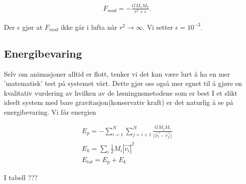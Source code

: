 \documentclass[11pt, twocolumn]{article}
\begin{document}
\begin{align}
F_{mod} = -\frac{GM_1M_2}{r^2 + \epsilon}.
\end{align}

Der $\epsilon$ gjør at $F_{mod}$ ikke går i lufta når $r^2 \rightarrow \infty$.
Vi setter $\epsilon = 10^{-3}$. 

\subsection{Energibevaring}
Selv om animasjoner alltid er flott, tenker vi det kan være lurt å ha en mer
'matematisk' test på systemet vårt. Dette gjør oss også mer egnet til
å gjøre en kvalitativ vurdering av hvilken av de løsningnsmetodene som er best
I et slikt ideelt system med bare 
gravitasjon(konservativ kraft) er det naturlig å se på energibevaring. Vi får
energien

\begin{align}
E_{p} = - \sum_{i = 1}^{N} \sum_{j = i+1}^{N} \frac{GM_jM_i}{{||\vec{r_i} - \vec{r_j}||}} \\
E_{k} = \sum_{i} \frac{1}{2}M_i|\vec{v_i}|^2 \\
E_{tot} = E_{p} + E_{k}
\end{align}

I tabell ???

\printbibliography
\end{document}

